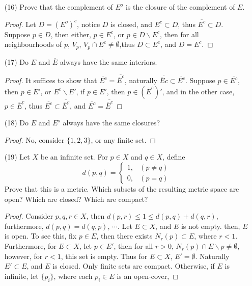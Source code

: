 \documentclass{amsart}
\numberwithin{equation}{section}
\theoremstyle{plain}
\theoremstyle{definition}
\begin{document}
\begin{enumerate}
\begin{proof}
  \end{proof}
  \item[(16)] Prove that the complement of $E^o$ is the closure of the complement of $E$.
  \begin{proof}
    Let $D = (E^o)^c$, notice $D$ is closed, and $E^c \subset D$, thus $\overline{E^c} \subset D$. Suppose $p \in D$, then either,
    $p \in E^c$, or $p \in D \backslash E^c$, then for all neighbourhoods of $p$, $V_p$, $V_p \cap E^c \not= \emptyset$,thus $D \subset \overline{E^c}$, and $D = \overline{E^c}$.
  \end{proof}
  \item[(17)] Do $E$ and $\overline{E}$ always have the same interiors.
  \begin{proof}
    It suffices to show that $\overline{E^c} = \overline{\overline{E}^c}$, naturally $\overline{\overline{E}c} \subset \overline{E^c}$.
    Suppose $p \in \overline{E^c}$, then $p \in E'$, or $E^c \backslash E'$, if $p \in E'$, then $p \in (\overline{E}^c)'$, and in the other case, $p \in \overline{E}^c$, thus $\overline{E^c} \subset \overline{\overline{E}^c}$,
    and $\overline{E^c} = \overline{\overline{E}^c}$
  \end{proof}
  \item[(18)] Do $E$ and $E^o$ always have the same closures?
  \begin{proof}
    No, consider $\{1,2,3\}$, or any finite set.
  \end{proof}
  \item[(19)] Let $X$ be an infinite set. For $p \in X$ and $q \in X$, define
  \begin{equation}
    d(p, q) = \begin{cases} 1,& (p \not=q) \\ 
    0, & (p = q)
    \end{cases}
  \end{equation}
  Prove that this is a metric. Which subsets of the resulting metric space are open? Which are
  closed? Which are compact?
  \begin{proof}
    Consider $p, q, r \in X$, then $d(p, r) \leq 1 \leq d(p, q) + d(q, r)$, furthermore, $d(p,q) = d(q, p)$, $\cdots$. Let $E \subset X$, and $E$ is not empty.
    then, $E$ is open. To see this, fix $p \in E$, then there exists $N_r(p) \subset E$, where $r < 1$. Furthermore, for $E \subset X$, let $p \in E'$, 
    then for all $r > 0$, $N_r(p) \cap E \backslash{p} \not= \emptyset$, however, for $r < 1$, this set is empty. Thus for $E \subset X$, $E' = \emptyset$.
    Naturally $E' \subset E$, and $E$ is closed. Only finite sets are compact. Otherwise, if $E$ is infinite, let $\{p_i\}$, where each $p_i \in E$ is an open-cover, 

\end{proof}
\end{enumerate}
\end{document}
